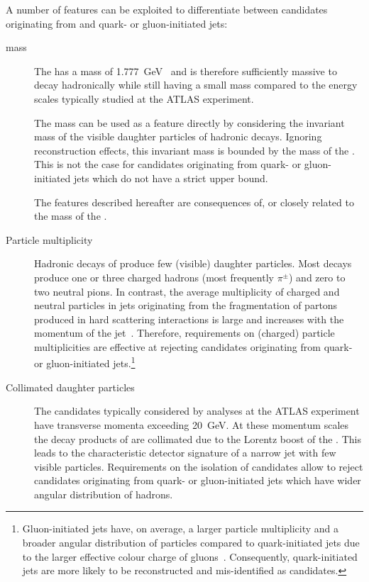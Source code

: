 A number of features can be exploited to differentiate between
\tauhadvis candidates originating from \tauhad and quark- or
gluon-initiated jets:
\begin{description}

\item[\taulepton mass] The \taulepton has a mass of
  \SI{1.777}{\GeV}~\cite{pdg2020} and is therefore sufficiently
  massive to decay hadronically while still having a small mass
  compared to the energy scales typically studied at the ATLAS
  experiment.

  The \taulepton mass can be used as a feature directly by considering
  the invariant mass of the visible daughter particles of hadronic
  \taulepton decays. Ignoring reconstruction effects, this invariant
  mass is bounded by the mass of the \taulepton. This is not the case
  for \tauhadvis candidates originating from quark- or gluon-initiated
  jets which do not have a strict upper bound.

  The features described hereafter are consequences of, or closely
  related to the mass of the \taulepton.

\item[Particle multiplicity] Hadronic decays of \tauleptons produce
  few (visible) daughter particles. Most decays produce one or three
  charged hadrons (most frequently $\pi^{\pm}$) and zero to two
  neutral pions.
  In contrast, the average multiplicity of charged and neutral
  particles in jets originating from the fragmentation of partons
  produced in hard scattering interactions is large and increases with
  the momentum of the
  jet~\cite{Ellis:1996mzs,STDM-2015-12}. Therefore, requirements on
  (charged) particle multiplicities are effective at rejecting
  \tauhadvis candidates originating from quark- or gluon-initiated
  jets.\footnote{Gluon-initiated jets have, on average, a larger
    particle multiplicity and a broader angular distribution of
    particles compared to quark-initiated jets due to the larger
    effective colour charge of
    gluons~\cite{Ellis:1996mzs}. Consequently, quark-initiated jets
    are more likely to be reconstructed and mis-identified as
    \tauhadvis candidates.}

\item[Collimated daughter particles] The \tauhadvis candidates
  typically considered by analyses at the ATLAS experiment have
  transverse momenta exceeding \SI{20}{\GeV}. At these momentum scales
  the decay products of \tauleptons are collimated due to the Lorentz
  boost of the \taulepton. This leads to the characteristic detector
  signature of a narrow jet with few visible particles. Requirements
  on the isolation of \tauhadvis candidates allow to reject candidates
  originating from quark- or gluon-initiated jets which have wider
  angular distribution of hadrons.


\end{description}
